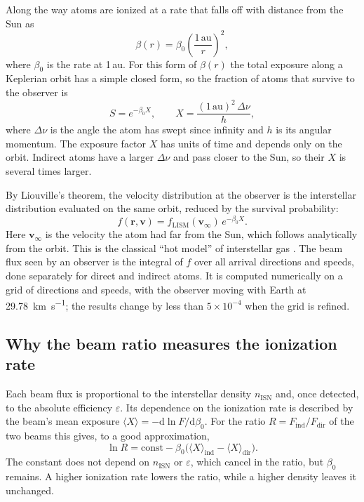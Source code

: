 \documentclass[10pt,a4paper,twocolumn]{article}
\newcommand{\Fdir}{F_\mathrm{dir}}
\newcommand{\Find}{F_\mathrm{ind}}
\newcommand{\nisn}{n_\mathrm{ISN}}
\newcommand{\au}{\mathrm{au}}
\begin{document}
Along the way atoms are ionized at a rate that falls off with distance from
the Sun as
\begin{equation}
  \beta(r) = \beta_0\left(\frac{1\,\au}{r}\right)^2 ,
\end{equation}
where $\beta_0$ is the rate at 1\,au. For this form of $\beta(r)$ the total
exposure along a Keplerian orbit has a simple closed form, so the fraction of
atoms that survive to the observer is
\begin{equation}
  S = e^{-\beta_0 X}, \qquad X = \frac{(1\,\au)^2\,\Delta\nu}{h},
  \label{eq:survival}
\end{equation}
where $\Delta\nu$ is the angle the atom has swept since infinity and $h$ is
its angular momentum. The exposure factor $X$ has units of time and depends
only on the orbit. Indirect atoms have a larger $\Delta\nu$ and pass closer
to the Sun, so their $X$ is several times larger.

By Liouville's theorem, the velocity distribution at the observer is the
interstellar distribution evaluated on the same orbit, reduced by the survival
probability:
\begin{equation}
  f(\mathbf{r},\mathbf{v}) = f_\mathrm{LISM}(\mathbf{v}_\infty)\,e^{-\beta_0 X}.
\end{equation}
Here $\mathbf{v}_\infty$ is the velocity the atom had far from the Sun, which
follows analytically from the orbit. This is the classical ``hot model'' of
interstellar gas \citep{Thomas1978,Lee2012}. The beam flux seen by an observer
is the integral of $f$ over all arrival directions and speeds, done
separately for direct and indirect atoms. It is computed numerically on a
grid of directions and speeds, with the observer moving with Earth at
\SI{29.78}{\kilo\metre\per\second}; the results change by less than
$5\times10^{-4}$ when the grid is refined.

\subsection{Why the beam ratio measures the ionization rate}

Each beam flux is proportional to the interstellar density $\nisn$ and, once
detected, to the absolute efficiency $\varepsilon$. Its dependence on the
ionization rate is described by the beam's mean exposure
$\langle X\rangle = -\mathrm{d}\ln F/\mathrm{d}\beta_0$. For the ratio
$R = \Find/\Fdir$ of the two beams this gives, to a good approximation,
\begin{equation}
  \ln R = \mathrm{const} - \beta_0\big(\langle X\rangle_\mathrm{ind} - \langle X\rangle_\mathrm{dir}\big).
  \label{eq:ratio}
\end{equation}
The constant does not depend on $\nisn$ or $\varepsilon$, which cancel in the
ratio, but $\beta_0$ remains. A higher ionization rate lowers the ratio,
while a higher density leaves it unchanged.
\end{document}
